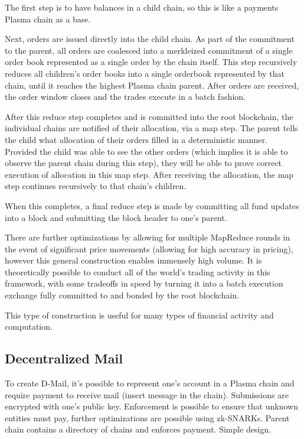\documentclass[letterpaper, 11pt]{article}
\begin{document}
The first step is to have balances in a child chain, so this is like a payments
Plasma chain as a base.

Next, orders are issued directly into the child chain. As part of the commitment
to the parent, all orders are coalesced into a merkleized commitment of a single
order book represented as a single order by the chain itself. This step
recursively reduces all children's order books into a single orderbook
represented by that chain, until it reaches the highest Plasma chain parent.
After orders are received, the order window closes and the trades execute in a
batch fashion.

After this reduce step completes and is committed into the root blockchain, the
individual chains are notified of their allocation, via a map step. The parent
tells the child what allocation of their orders filled in a deterministic
manner. Provided the child was able to see the other orders (which implies it is
able to observe the parent chain during this step), they will be able to prove
correct execution of allocation in this map step. After receiving the
allocation, the map step continues recursively to that chain's children.

When this completes, a final reduce step is made by committing all fund updates
into a block and submitting the block header to one's parent.

There are further optimizations by allowing for multiple MapReduce rounds in the
event of significant price movements (allowing for high accuracy in pricing),
however this general construction enables immensely high volume. It is
theoretically possible to conduct all of the world's trading activity in this
framework, with some tradeoffs in speed by turning it into a batch execution
exchange fully committed to and bonded by the root blockchain.

This type of construction is useful for many types of financial activity and
computation.

\subsection{Decentralized Mail}

To create D-Mail, it's possible to represent one's account in a Plasma chain and
require payment to receive mail (insert message in the chain). Submissions are
encrypted with one's public key. Enforcement is possible to ensure that unknown
entities must pay, further optimizations are possible using zk-SNARKs. Parent
chain contains a directory of chains and enforces payment. Simple design.
\end{document}
